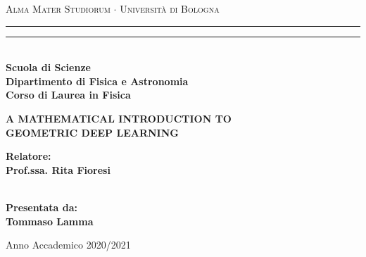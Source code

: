 \documentclass[../main.tex]{subfiles}
\begin{document}
\begin{titlepage}
   \begin{center}
        {{\Large{\textsc{Alma Mater Studiorum $\cdot$ Universit\`a di Bologna}}}} 
        \rule[0.1cm]{15.8cm}{0.1mm}
        \rule[0.5cm]{15.8cm}{0.6mm}
        \\\vspace{3mm}
        {\small{\bf Scuola di Scienze \\ 
        Dipartimento di Fisica e Astronomia\\
        Corso di Laurea in Fisica}}
    \end{center}
    \vspace{23mm}
    \begin{center}
        {{\LARGE{\bf A MATHEMATICAL INTRODUCTION TO \\ \vspace{0.5cm} GEOMETRIC DEEP LEARNING}}\\}
    \end{center}
    \vspace{50mm} \par \noindent
    \begin{minipage}[t]{0.47\textwidth}
        {\large{\bf Relatore: \vspace{2mm}\\
        Prof.ssa. Rita Fioresi\\\\
        }}
    \end{minipage}
    \hfill
    \begin{minipage}[t]{0.47\textwidth}\raggedleft
        {\large{\bf Presentata da:
        \vspace{2mm}\\
        Tommaso Lamma}}
    \end{minipage}
    \vspace{40mm}
    \begin{center}
        Anno Accademico 2020/2021
    \end{center}
\end{titlepage}
\end{document}

